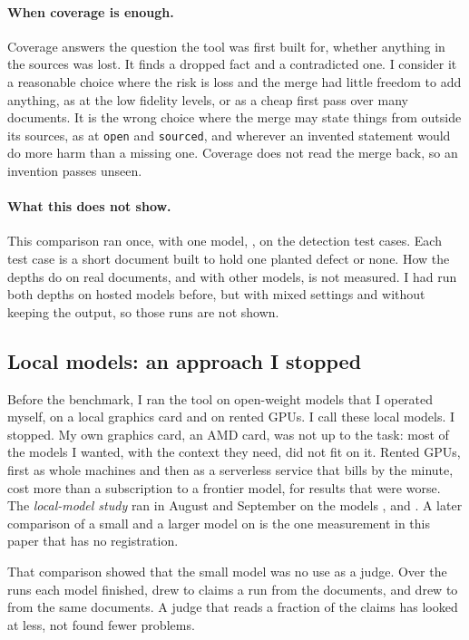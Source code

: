 \paragraph{When coverage is enough.} Coverage answers the question the tool was first built for, whether anything in the sources was lost. It finds a dropped fact and a contradicted one. I consider it a reasonable choice where the risk is loss and the merge had little freedom to add anything, as at the low fidelity levels, or as a cheap first pass over many documents. It is the wrong choice where the merge may state things from outside its sources, as at \texttt{open} and \texttt{sourced}, and wherever an invented statement would do more harm than a missing one. Coverage does not read the merge back, so an invention passes unseen.

\paragraph{What this does not show.} This comparison ran once, with one model, , on the  detection test cases. Each test case is a short document built to hold one planted defect or none. How the depths do on real documents, and with other models, is not measured. I had run both depths on hosted models before, but with mixed settings and without keeping the output, so those runs are not shown.

\subsection{Local models: an approach I stopped}
\label{sec:study}

Before the benchmark, I ran the tool on open-weight models that I operated myself, on a local graphics card and on rented GPUs. I call these local models. I stopped. My own graphics card, an AMD card, was not up to the task: most of the models I wanted, with the context they need, did not fit on it. Rented GPUs, first as whole machines and then as a serverless service that bills by the minute, cost more than a subscription to a frontier model, for results that were worse. The \emph{local-model study} ran in August and September on the models ,  and . A later comparison of a small and a larger model on  is the one measurement in this paper that has no registration.

That comparison showed that the small model was no use as a judge. Over the runs each model finished, \texttt{} drew  to  claims a run from the documents, and \texttt{} drew  to  from the same documents. A judge that reads a fraction of the claims has looked at less, not found fewer problems.


